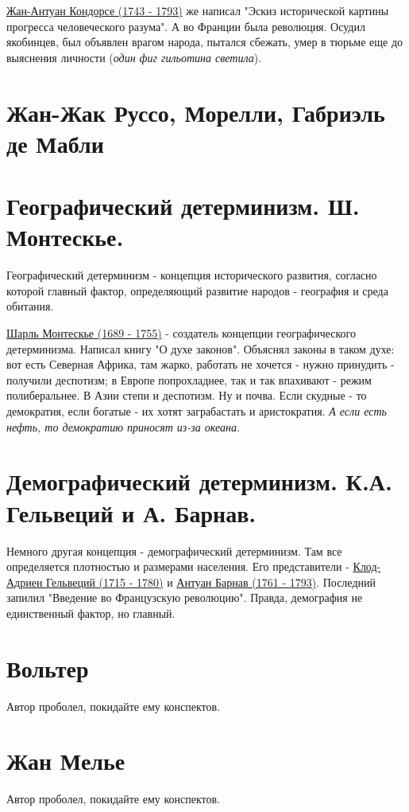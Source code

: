 \underline{Жан-Антуан Кондорсе (1743 - 1793)} же написал "Эскиз исторической картины прогресса человеческого разума". А во Франции была революция. Осудил якобинцев, был объявлен врагом народа, пытался сбежать, умер в тюрьме еще до выяснения личности (\textit{один фиг гильотина светила}).

\section{Жан-Жак Руссо, Морелли, Габриэль де Мабли}
\section{Географический детерминизм. Ш. Монтескье.}
Географический детерминизм - концепция исторического развития, согласно которой главный фактор, определяющий развитие народов - география и среда обитания.

\underline{Шарль Монтескье (1689 - 1755)} - создатель концепции географического детерминизма. Написал книгу "О духе законов". Объяснял законы в таком духе: вот есть Северная Африка, там жарко, работать не хочется - нужно принудить - получили деспотизм; в Европе попрохладнее, так и так впахивают - режим полиберальнее. В Азии степи и деспотизм. Ну и почва. Если скудные - то демократия, если богатые - их хотят заграбастать и аристократия. \textit{А если есть нефть, то демократию приносят из-за океана}.  

\section{Демографический детерминизм.  К.А. Гельвеций и А. Барнав.}
Немного другая концепция - демографический детерминизм.  Там все определяется плотностью и размерами населения. Его представители - \underline{Клод-Адриен Гельвеций (1715 - 1780)} и \underline{Антуан Барнав (1761 - 1793)}. Последний запилил "Введение во Французскую революцию". Правда, демография не единственный фактор, но главный.

\section{Вольтер}
Автор проболел, покидайте ему конспектов.
\section{Жан Мелье}
Автор проболел, покидайте ему конспектов.
